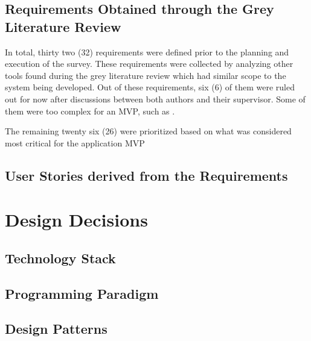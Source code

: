 \subsection{Requirements Obtained through the Grey Literature Review}\label{ext:requirements-grey}

In total, thirty two (32) requirements were defined prior to the planning and execution of the survey. These requirements were collected by analyzing other tools found during the grey literature review which had similar scope to the system being developed. Out of these requirements, six (6) of them were ruled out for now after discussions between both authors and their supervisor. Some of them were too complex for an \ac{MVP}, such as .

The remaining twenty six (26) were prioritized based on what was considered most critical for the application \ac{MVP}

\subsection{User Stories derived from the Requirements}

\section{Design Decisions}
\subsection{Technology Stack}
\subsection{Programming Paradigm}
\subsection{Design Patterns}